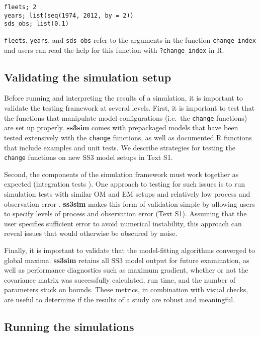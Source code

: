 \documentclass[11pt]{article}
\begin{document}
\begin{spacing}{1.2}
\begin{verbatim}
fleets; 2
years; list(seq(1974, 2012, by = 2))
sds_obs; list(0.1)
\end{verbatim}

\noindent
\texttt{fleets}, \texttt{years}, and \texttt{sds\_obs} refer to the arguments
in the function \texttt{change\_index} and users can read the help for this
function with \texttt{?change\_index} in \textsf{R}.

\subsection*{Validating the simulation setup}

Before running and interpreting the results of a simulation, it is
important to validate the testing framework at several levels. First, it is
important to test that the functions that manipulate model configurations
(i.e.~the \texttt{change} functions) are set up properly. \textbf{ss3sim} comes
with prepackaged models that have been tested extensively with the
\texttt{change} functions, as well as documented \textsf{R} functions that
include examples and unit tests. We describe strategies for testing the
\texttt{change} functions on new SS3 model setups in Text S1.

Second, the components of the simulation framework must work together as
expected (integration tests \cite{wilson2014}). One approach to testing for
such issues is to run simulation tests with similar OM and EM setups and
relatively low process and observation error \cite{hilborn1992}.
\textbf{ss3sim} makes this form of validation simple by allowing users to
specify levels of process and observation error (Text S1). Assuming
that the user specifies sufficient error to avoid numerical instability, this
approach can reveal issues that would otherwise be obscured by noise.

Finally, it is important to validate that the model-fitting algorithms
converged to global maxima. \textbf{ss3sim} retains all SS3 model output for
future examination, as well as performance diagnostics such as maximum
gradient, whether or not the covariance matrix was successfully calculated, run
time, and the number of parameters stuck on bounds. These metrics, in
combination with visual checks, are useful to determine if the results of a
study are robust and meaningful.

\subsection*{Running the simulations}


\end{spacing}
\end{document}
